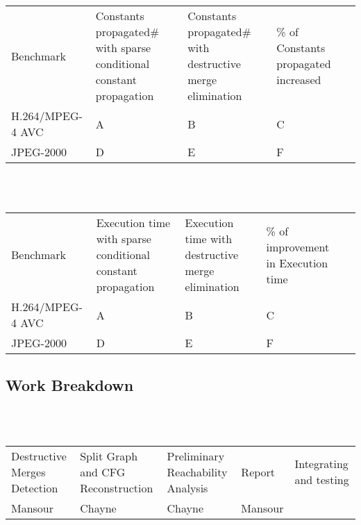 \documentclass{article}
\begin{document}
\begin{adjustbox}{center}
\renewcommand{\arraystretch}{2}
\begin{tabular}{| C{3cm} | C{3cm} | C{3cm} | C{3cm} | C{3cm} |}
\hline
Benchmark & Constants propagated\# with sparse conditional constant propagation & Constants propagated\# with destructive merge elimination & \% of Constants propagated increased \\  
H.264/MPEG-4 AVC & A & B & C  \\ 
JPEG-2000 & D & E & F  \\ 

\end{tabular}
\end{adjustbox}

~\\~
\begin{adjustbox}{center}
\renewcommand{\arraystretch}{2}
\begin{tabular}{| C{3cm} | C{3cm} | C{3cm} | C{3cm} | C{3cm} |}
\hline
Benchmark & Execution time with sparse conditional constant propagation & Execution time with destructive merge elimination & \% of improvement in Execution time \\  
H.264/MPEG-4 AVC & A & B & C  \\ 
JPEG-2000 & D & E & F  \\ 
\end{tabular}
\end{adjustbox}
\subsection{Work Breakdown}
~\\~
\begin{adjustbox}{center}
\renewcommand{\arraystretch}{2}
\begin{tabular}{| C{3cm} | C{3cm} | C{3cm} | C{3cm} | C{3cm} |}
\hline
Destructive Merges Detection & Split Graph and CFG Reconstruction & Preliminary Reachability Analysis & Report & Integrating and testing \\  
Mansour & Chayne & Chayne & Mansour &  \\ 

\end{tabular}
\end{adjustbox}
\end{document}
